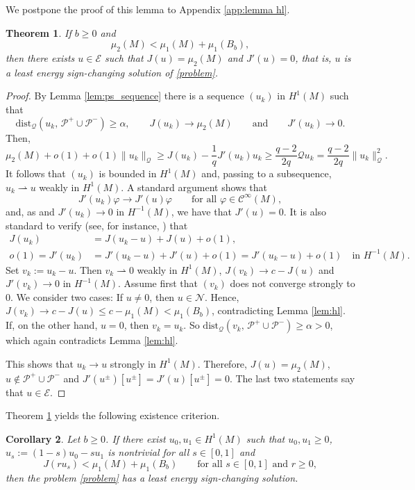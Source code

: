 \documentclass[reqno,11pt,oneside]{amsart}
\newtheorem{theorem}{Theorem}[section]
\newtheorem{corollary}[theorem]{Corollary}
\numberwithin{equation}{section}
\def\rh{\rightharpoonup}
\def\vp{\varphi}
\def\cC{\mathcal{C}}
\def\cE{\mathcal{E}}
\def\cN{\mathcal{N}}
\def\cP{\mathcal{P}}
\def\dist{\mathrm{dist}}
\begin{document}
We postpone the proof of this lemma to Appendix \ref{app:lemma hl}.

\begin{theorem} \label{thm:mu_2}
If $b\geq 0$ and
$$\mu_2(M)<\mu_1(M)+\mu_1(B_b),$$ 
then there exists $u\in\cE$ such that $J(u)=\mu_2(M)$ and $J'(u)=0$, that is, $u$ is a least energy sign-changing solution of \eqref{problem}.
\end{theorem} 

\begin{proof}
By Lemma \ref{lem:ps_sequence} there is a sequence $(u_k)$ in $H^1(M)$ such that 
\begin{equation} \label{eq:ps}
\dist_\mathscr{Q}(u_k,\,\cP^+\cup\cP^-)\geq\alpha, \qquad J(u_k)\to\mu_2(M)\qquad\text{and}\qquad J'(u_k)\to 0.
\end{equation}
Then,
$$\mu_2(M)+o(1)+o(1)\|u_k\|_\mathscr{Q}\geq J(u_k)-\frac{1}{q} J'(u_k)u_k\geq\frac{q-2}{2q}\mathscr{Q}u_k=\frac{q-2}{2q}\|u_k\|_\mathscr{Q}^2.$$
It follows that $(u_k)$ is bounded in $H^1(M)$ and, passing to a subsequence, $u_k\rh u$ weakly in $H^1(M)$. A standard argument shows that
$$J'(u_k)\vp\to J'(u)\vp\qquad\text{for all \ }\vp\in \cC^\infty(M),$$
and, as  and $J'(u_k)\to 0$ in $H^{-1}(M)$, we have that $J'(u)=0$. It is also standard to verify (see, for instance, \cite[Section 8.3]{w}) that
\begin{align*}
J(u_k)&=J(u_k-u)+J(u)+o(1),\\
o(1)=J'(u_k)&=J'(u_k-u)+J'(u) + o(1)=J'(u_k-u)+o(1)\quad\text{in \ }H^{-1}(M).
\end{align*}
Set $v_k:=u_k-u$. Then $v_k\rh 0$ weakly in $H^1(M)$, $J(v_k)\to c-J(u)$ and $J'(v_k)\to 0$ in $H^{-1}(M)$. Assume first that $(v_k)$ does not converge strongly to $0$. We consider two cases: If $u\neq 0$, then $u\in\cN$. Hence, $J(v_k)\to c-J(u)\leq c-\mu_1(M)<\mu_1(B_b)$, contradicting Lemma \ref{lem:hl}. If, on the other hand, $u= 0$, then $v_k=u_k$. So $\dist_\mathscr{Q}(v_k,\,\cP^+\cup\cP^-)\geq\alpha>0$, which again contradicts Lemma \ref{lem:hl}. 

This shows that $u_k\to u$ strongly in $H^1(M)$. Therefore, $J(u)=\mu_2(M)$, $u\notin\cP^+\cup\cP^-$ and $J'(u^\pm)[u^\pm]=J'(u)[u^\pm]=0$. The last two statements say that $u\in\cE$. 
\end{proof}

Theorem \ref{thm:mu_2} yields the following existence criterion.

\begin{corollary}\label{cor:mu_2a}
Let $b\geq 0$. If there exist $u_0,u_1\in H^1(M)$ such that $u_0,u_1\geq 0$, $u_s:=(1-s)u_0-su_1$ is nontrivial for all $s\in[0,1]$ and 
$$J(ru_s)< \mu_1(M)+\mu_1(B_b)\qquad\text{for all \ }s\in[0,1]\text{ \ and \ }r\geq 0,$$ 
then the problem \eqref{problem} has a least energy sign-changing solution.
\end{corollary}
\end{document}
